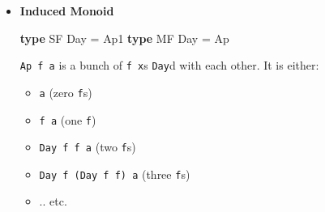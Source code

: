 \documentclass[]{article}
\newenvironment{Shaded}{}{}
\newcommand{\DataTypeTok}[1]{\textcolor[rgb]{0.56,0.13,0.00}{#1}}
\newcommand{\KeywordTok}[1]{\textcolor[rgb]{0.00,0.44,0.13}{\textbf{#1}}}
\newcommand{\NormalTok}[1]{#1}
\newcommand{\OperatorTok}[1]{\textcolor[rgb]{0.40,0.40,0.40}{#1}}
\newcommand{\OtherTok}[1]{\textcolor[rgb]{0.00,0.44,0.13}{#1}}
\renewcommand{\href}[2]{#2\footnote{\url{#1}}}
\begin{document}
\begin{itemize}
\begin{Shaded}
\begin{Highlighting}[]
\NormalTok{binterpret }\OperatorTok{@}\DataTypeTok{Day}
\OtherTok{    ::} \DataTypeTok{Apply}\NormalTok{ h}
    \OtherTok{=>}\NormalTok{ f }\OperatorTok{\textasciitilde{}>}\NormalTok{ h}
    \OtherTok{{-}>}\NormalTok{ g }\OperatorTok{\textasciitilde{}>}\NormalTok{ h}
    \OtherTok{{-}>} \DataTypeTok{Day}\NormalTok{ f g }\OperatorTok{\textasciitilde{}>}\NormalTok{ h}

\NormalTok{inL   }\OperatorTok{@}\DataTypeTok{Day}\OtherTok{ ::} \DataTypeTok{Applicative}\NormalTok{ g }\OtherTok{=>}\NormalTok{ f        }\OperatorTok{\textasciitilde{}>} \DataTypeTok{Day}\NormalTok{ f g}
\NormalTok{inR   }\OperatorTok{@}\DataTypeTok{Day}\OtherTok{ ::} \DataTypeTok{Applicative}\NormalTok{ f }\OtherTok{=>}\NormalTok{ g        }\OperatorTok{\textasciitilde{}>} \DataTypeTok{Day}\NormalTok{ f g}
\NormalTok{pureT }\OperatorTok{@}\DataTypeTok{Day}\OtherTok{ ::} \DataTypeTok{Applicative}\NormalTok{ h }\OtherTok{=>} \DataTypeTok{Identity} \OperatorTok{\textasciitilde{}>}\NormalTok{ h}
\end{Highlighting}
\end{Shaded}

  \texttt{Apply}, from
  \emph{\href{https://hackage.haskell.org/package/semigroupoids/docs/Data-Functor-Apply.html}{Data.Functor.Apply}}
  in \emph{semigroupoids}, is ``\texttt{Applicative} without \texttt{pure}''; it
  only has \texttt{\textless{}*\textgreater{}} (called
  \texttt{\textless{}.\textgreater{}}).

  \texttt{pureT} is essentially
  \texttt{pure\ ::\ Applicative\ h\ =\textgreater{}\ a\ -\textgreater{}\ h\ a}.
\item
  \textbf{Induced Monoid}

\begin{Shaded}
\begin{Highlighting}[]
\KeywordTok{type} \DataTypeTok{SF} \DataTypeTok{Day} \OtherTok{=} \DataTypeTok{Ap1}
\KeywordTok{type} \DataTypeTok{MF} \DataTypeTok{Day} \OtherTok{=} \DataTypeTok{Ap}
\end{Highlighting}
\end{Shaded}

  \texttt{Ap\ f\ a} is a bunch of \texttt{f\ x}s \texttt{Day}d with each other.
  It is either:

  \begin{itemize}
  \tightlist
  \item
    \texttt{a} (zero \texttt{f}s)
  \item
    \texttt{f\ a} (one \texttt{f})
  \item
    \texttt{Day\ f\ f\ a} (two \texttt{f}s)
  \item
    \texttt{Day\ f\ (Day\ f\ f)\ a} (three \texttt{f}s)
  \item
    .. etc.
  \end{itemize}


\end{itemize}
\end{document}

